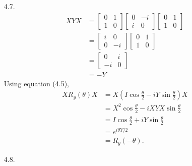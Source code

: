 \documentclass[a4paper,12pt]{article}
\begin{document}
\begin{enumerate}
    \item[4.7.]
        \begin{align*}
            XYX &=
            \left[ \begin{array}{cc}
                0 & 1 \\
                1 & 0
            \end{array} \right]
            \left[ \begin{array}{cc}
                0 & -i \\
                i & 0
            \end{array} \right]
            \left[ \begin{array}{cc}
                0 & 1 \\
                1 & 0
            \end{array} \right] \\
            &=
            \left[ \begin{array}{cc}
                i & 0 \\
                0 & -i 
            \end{array} \right]
            \left[ \begin{array}{cc}
                0 & 1 \\
                1 & 0
            \end{array} \right] \\
            &=
            \left[ \begin{array}{cc}
                0 & i \\
                -i & 0
            \end{array} \right] \\
            &= -Y
        \end{align*}
        Using equation (4.5),
        \begin{align*}
            XR_y(\theta)X &= X \left(I \cos{\frac{\theta}{2}} - iY \sin{\frac{\theta}{2}} \right) X \\
            &= X^2 \cos{\frac{\theta}{2}} - iXYX \sin{\frac{\theta}{2}} \\
            &= I\cos{\frac{\theta}{2}} + iY \sin{\frac{\theta}{2}} \\
            &= e^{i\theta Y / 2} \\
            &= R_y(-\theta).
        \end{align*}

    \item[4.8.]
        \begin{enumerate}


\end{enumerate}
\end{enumerate}
\end{document}
